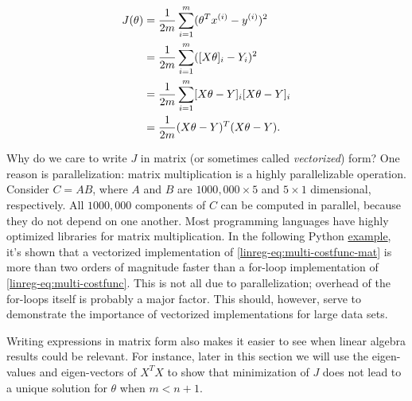 \documentclass{article}
\theoremstyle{definition}
\begin{document}
\begin{align}
    J(\theta) &= \frac{1}{2m}\sum_{i=1}^{m}(\theta^Tx^{(i)} - y^{(i)})^2\notag\\
    &= \frac{1}{2m}\sum_{i=1}^{m}([X\theta]_i - Y_i)^2\notag\\
    &= \frac{1}{2m}\sum_{i=1}^{m}[X\theta - Y]_i[X\theta - Y]_i\notag\\
    &= \frac{1}{2m}(X\theta - Y)^T(X\theta - Y).
    \label{linreg-eq:multi-costfunc-mat}
\end{align}

Why do we care to write $J$ in matrix (or sometimes called \textit{vectorized}) form? One reason is parallelization: matrix multiplication is a highly parallelizable operation. Consider $C=AB$, where $A$ and $B$ are $1000,000 \times 5$ and $5 \times 1$ dimensional, respectively. All $1000,000$ components of $C$ can be computed in parallel, because they do not depend on one another. Most programming languages have highly optimized libraries for matrix multiplication. In the following Python \href{https://github.com/siavashaslanbeigi/machine_learning/blob/master/lin_reg/matrix.ipynb}{\color{blue} example}, it's shown that a vectorized implementation of \eqref{linreg-eq:multi-costfunc-mat} is more than two orders of magnitude faster than a for-loop implementation of \eqref{linreg-eq:multi-costfunc}. This is not all due to parallelization; overhead of the for-loops itself is probably a major factor. This should, however, serve to demonstrate the importance of vectorized implementations for large data sets.

Writing expressions in matrix form also makes it easier to see when linear algebra results could be relevant. For instance, later in this section we will use the eigen-values and eigen-vectors of $X^TX$ to show that minimization of $J$ does not lead to a unique solution for $\theta$ when $m<n+1$.


\end{document}
